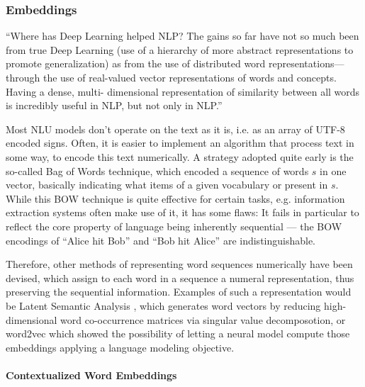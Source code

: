 \subsubsection*{Embeddings}

{\color{red} ``Where has Deep Learning helped NLP? The gains so far have not so much been from
true Deep Learning (use of a hierarchy of more abstract representations to promote
generalization) as from the use of distributed word representations—through the use
of real-valued vector representations of words and concepts. Having a dense, multi-
dimensional representation of similarity between all words is incredibly useful in NLP,
but not only in NLP.'' \citep[p.~703]{manning2015computational}}

Most NLU models don't operate on the text as it is, i.e. as an array of UTF-8 encoded
signs. Often, it is easier to implement an algorithm that process text in some way, to
encode this text numerically. A strategy adopted quite early is the so-called Bag of
Words \citep{harris1954distributional} technique, which encoded a sequence of words $s$
in one vector, basically indicating what items of a given vocabulary or present in $s$.
While this BOW technique is quite effective for certain tasks, e.g. information extraction
systems often make use of it, it has some flaws: It fails in particular to reflect the core
property of language being inherently sequential --- the BOW encodings of ``Alice hit Bob''
and ``Bob hit Alice'' are indistinguishable.

Therefore, other methods of representing word sequences numerically have been devised, which assign
to each word in a sequence a numeral representation, thus preserving the sequential information.
Examples of such a representation would be Latent Semantic Analysis \citep{furnas1988using}, which
generates word vectors by reducing high-dimensional word co-occurrence matrices via singular value
decomposotion, or word2vec \citep{mikolov2013distributed} which showed the possibility of letting a
neural model compute those embeddings applying a language modeling objective.



\paragraph*{Contextualized Word Embeddings}

